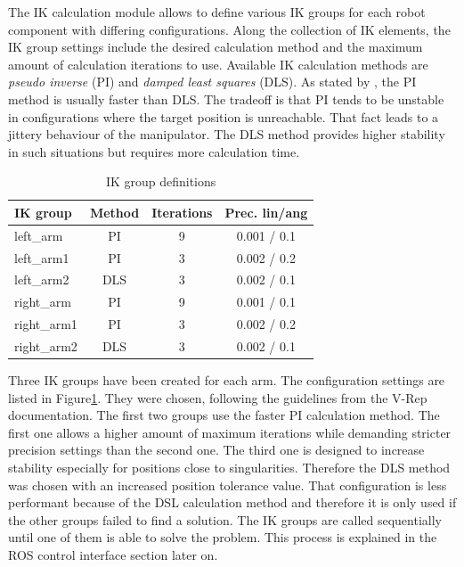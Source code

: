 The IK calculation module allows to define various IK groups for each robot component with differing configurations. Along the collection of IK elements, the IK group settings include the desired calculation method and the maximum amount of calculation iterations to use. Available IK calculation methods are \emph{pseudo inverse} (PI) and \emph{damped least squares} (DLS). As stated by \cite{buss2004}, the PI method is usually faster than DLS. The tradeoff is that PI tends to be unstable in configurations where the target position is unreachable. That fact leads to a jittery behaviour of the manipulator. The DLS method provides higher stability in such situations but requires more calculation time.

\begin{table}[h]
  \centering
  \label{fig:ik_defs}
  \begin{tabular}[h]{|l|c|c|c|} \hline
	\textbf{IK group} & \textbf{Method} & \textbf{Iterations} & \textbf{Prec. lin/ang} \\ \hline
	left\_arm & PI & 9 & 0.001 / 0.1  \\
	left\_arm1 & PI & 3 & 0.002 / 0.2  \\
	left\_arm2 & DLS & 3 & 0.002 / 0.1  \\
	right\_arm & PI & 9 & 0.001 / 0.1  \\
	right\_arm1 & PI & 3 & 0.002 / 0.2  \\
	right\_arm2 & DLS & 3 & 0.002 / 0.1  \\ \hline
  \end{tabular}
  \caption{IK group definitions}
\end{table}

Three IK groups have been created for each arm. The configuration settings are listed in Figure\ref{fig:ik_defs}. They were chosen, following the guidelines from the V-Rep documentation. The first two groups use the faster PI calculation method. The first one allows a higher amount of maximum iterations while demanding stricter precision settings than the second one. The third one is designed to increase stability especially for positions close to singularities. Therefore the DLS method was chosen with an increased position tolerance value. That configuration is less performant because of the DSL calculation method and therefore it is only used if the other groups failed to find a solution. The IK groups are called sequentially until one of them is able to solve the problem. This process is explained in the ROS control interface section later on.

